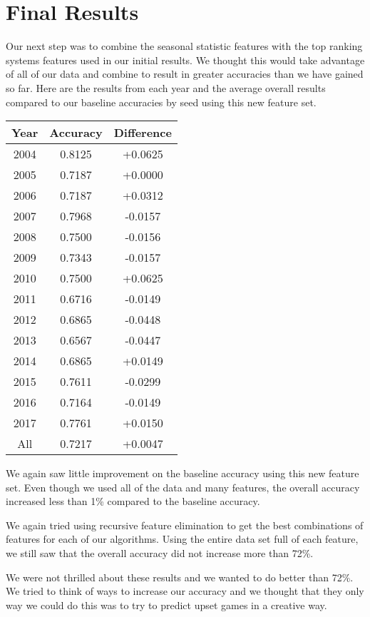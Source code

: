 \section{Final Results}
Our next step was to combine the seasonal statistic features with the top ranking systems features used in our initial results. 
We thought this would take advantage of all of our data and combine to result in greater accuracies than we have gained so far. 
Here are the results from each year and the average overall results compared to our baseline accuracies by seed using this new feature set.


\vspace{0.5cm}
\begin{tabular}{c c c}
    \toprule
    Year & Accuracy & Difference\\
    \midrule
    2004 & 0.8125 & +0.0625\\
    2005 & 0.7187 & +0.0000\\
    2006 & 0.7187 & +0.0312\\
    2007 & 0.7968 & -0.0157\\
    2008 & 0.7500 & -0.0156\\
    2009 & 0.7343 & -0.0157\\
    2010 & 0.7500 & +0.0625\\
    2011 & 0.6716 & -0.0149\\
    2012 & 0.6865 & -0.0448\\
    2013 & 0.6567 & -0.0447\\
    2014 & 0.6865 & +0.0149\\
    2015 & 0.7611 & -0.0299\\
    2016 & 0.7164 & -0.0149\\
    2017 & 0.7761 & +0.0150\\
    All & 0.7217 & +0.0047\\
    \bottomrule
\end{tabular}
\vspace{0.5cm}

We again saw little improvement on the baseline accuracy using this new feature set. 
Even though we used all of the data and many features, the overall accuracy increased less than 1\% compared to the baseline accuracy. 

We again tried using recursive feature elimination to get the best combinations of features for each of our algorithms. 
Using the entire data set full of each feature, we still saw that the overall accuracy did not increase more than 72\%. 

We were not thrilled about these results and we wanted to do better than 72\%. 
We tried to think of ways to increase our accuracy and we thought that they only way we could do this was to try to predict upset games in a creative way.